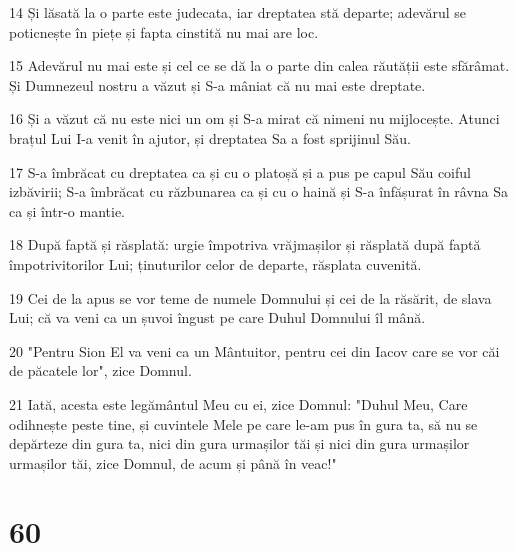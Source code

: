 \par 14 Și lăsată la o parte este judecata, iar dreptatea stă departe; adevărul se poticnește în piețe și fapta cinstită nu mai are loc.
\par 15 Adevărul nu mai este și cel ce se dă la o parte din calea răutății este sfărâmat. Și Dumnezeul nostru a văzut și S-a mâniat că nu mai este dreptate.
\par 16 Și a văzut că nu este nici un om și S-a mirat că nimeni nu mijlocește. Atunci brațul Lui I-a venit în ajutor, și dreptatea Sa a fost sprijinul Său.
\par 17 S-a îmbrăcat cu dreptatea ca și cu o platoșă și a pus pe capul Său coiful izbăvirii; S-a îmbrăcat cu răzbunarea ca și cu o haină și S-a înfășurat în râvna Sa ca și într-o mantie.
\par 18 După faptă și răsplată: urgie împotriva vrăjmașilor și răsplată după faptă împotrivitorilor Lui; ținuturilor celor de departe, răsplata cuvenită.
\par 19 Cei de la apus se vor teme de numele Domnului și cei de la răsărit, de slava Lui; că va veni ca un șuvoi îngust pe care Duhul Domnului îl mână.
\par 20 "Pentru Sion El va veni ca un Mântuitor, pentru cei din Iacov care se vor căi de păcatele lor", zice Domnul.
\par 21 Iată, acesta este legământul Meu cu ei, zice Domnul: "Duhul Meu, Care odihnește peste tine, și cuvintele Mele pe care le-am pus în gura ta, să nu se depărteze din gura ta, nici din gura urmașilor tăi și nici din gura urmașilor urmașilor tăi, zice Domnul, de acum și până în veac!"

\chapter{60}

